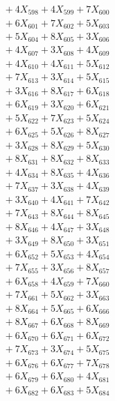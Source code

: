 \documentclass[a4paper,10pt]{article}
\begin{document}
{\begin{align}
&\;  + 4 X_{598} + 4 X_{599} + 7 X_{600} \\[0.3ex]
&\;  + 6 X_{601} + 7 X_{602} + 5 X_{603} \\[0.3ex]
&\;  + 5 X_{604} + 8 X_{605} + 3 X_{606} \\[0.3ex]
&\;  + 4 X_{607} + 3 X_{608} + 4 X_{609} \\[0.5ex]\allowbreak
&\;  + 4 X_{610} + 4 X_{611} + 5 X_{612} \\[0.3ex]
&\;  + 7 X_{613} + 3 X_{614} + 5 X_{615} \\[0.3ex]
&\;  + 3 X_{616} + 8 X_{617} + 6 X_{618} \\[0.3ex]
&\;  + 6 X_{619} + 3 X_{620} + 6 X_{621} \\[0.3ex]
&\;  + 5 X_{622} + 7 X_{623} + 5 X_{624} \\[0.3ex]
&\;  + 6 X_{625} + 5 X_{626} + 8 X_{627} \\[0.3ex]
&\;  + 3 X_{628} + 8 X_{629} + 5 X_{630} \\[0.3ex]
&\;  + 8 X_{631} + 8 X_{632} + 8 X_{633} \\[0.3ex]
&\;  + 4 X_{634} + 8 X_{635} + 4 X_{636} \\[0.3ex]
&\;  + 7 X_{637} + 3 X_{638} + 4 X_{639} \\[0.5ex]\allowbreak
&\;  + 3 X_{640} + 4 X_{641} + 7 X_{642} \\[0.3ex]
&\;  + 7 X_{643} + 8 X_{644} + 8 X_{645} \\[0.3ex]
&\;  + 8 X_{646} + 4 X_{647} + 3 X_{648} \\[0.3ex]
&\;  + 3 X_{649} + 8 X_{650} + 3 X_{651} \\[0.3ex]
&\;  + 6 X_{652} + 5 X_{653} + 4 X_{654} \\[0.3ex]
&\;  + 7 X_{655} + 3 X_{656} + 8 X_{657} \\[0.3ex]
&\;  + 6 X_{658} + 4 X_{659} + 7 X_{660} \\[0.3ex]
&\;  + 7 X_{661} + 5 X_{662} + 3 X_{663} \\[0.3ex]
&\;  + 8 X_{664} + 5 X_{665} + 6 X_{666} \\[0.3ex]
&\;  + 8 X_{667} + 6 X_{668} + 8 X_{669} \\[0.5ex]\allowbreak
&\;  + 6 X_{670} + 6 X_{671} + 6 X_{672} \\[0.3ex]
&\;  + 7 X_{673} + 3 X_{674} + 5 X_{675} \\[0.3ex]
&\;  + 6 X_{676} + 6 X_{677} + 7 X_{678} \\[0.3ex]
&\;  + 6 X_{679} + 6 X_{680} + 4 X_{681} \\[0.3ex]
&\;  + 6 X_{682} + 6 X_{683} + 5 X_{684} \\[0.3ex]

\end{align}}
\end{document}
